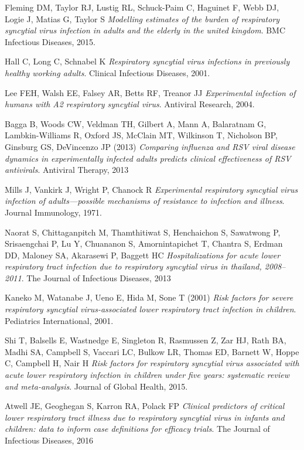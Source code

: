 \documentclass[a4paper]{article}
\begin{document}
\begin{thebibliography}{9}
Fleming DM, Taylor RJ, Lustig RL, Schuck-Paim C, Haguinet F, Webb DJ, Logie J, Matias G, Taylor S
\textit{Modelling estimates of the burden of respiratory syncytial virus infection in adults and the elderly in the united kingdom}.
BMC Infectious Diseases, 2015.

Hall C, Long C, Schnabel K
\textit{Respiratory syncytial virus infections in previously healthy working
adults}. 
Clinical Infectious Diseases, 2001.

Lee FEH, Walsh EE, Falsey AR, Betts RF, Treanor JJ
\textit{Experimental infection of humans with A2
respiratory syncytial virus}. 
Antiviral Research, 2004.

Bagga B, Woods CW, Veldman TH, Gilbert A, Mann A, Balaratnam G, Lambkin-Williams R, Oxford JS, McClain MT, Wilkinson T, Nicholson BP, Ginsburg GS, DeVincenzo JP (2013) 
\textit{Comparing influenza and RSV viral disease dynamics in experimentally infected adults predicts clinical effectiveness of RSV antivirals}. 
Antiviral Therapy, 2013

Mills J, Vankirk J, Wright P, Chanock R
\textit{Experimental respiratory syncytial virus infection of adults—possible mechanisms of resistance to infection and illness}. 
Journal Immunology, 1971.

Naorat S, Chittaganpitch M, Thamthitiwat S, Henchaichon S, Sawatwong P, Srisaengchai P, Lu Y, Chuananon S, Amornintapichet T, Chantra S, Erdman DD, Maloney SA, Akarasewi P, Baggett HC
\textit{Hospitalizations for acute lower respiratory tract infection due to respiratory syncytial virus in thailand, 2008–2011}.
The Journal of Infectious Diseases, 2013

Kaneko M, Watanabe J, Ueno E, Hida M, Sone T (2001) 
\textit{Risk factors for severe respiratory syncytial virus-associated lower respiratory tract infection in children}.
Pediatrics International, 2001.

Shi T, Balsells E, Wastnedge E, Singleton R, Rasmussen Z, Zar HJ, Rath BA, Madhi SA, Campbell S, Vaccari LC, Bulkow LR, Thomas ED, Barnett W, Hoppe C, Campbell H, Nair H
\textit{Risk factors for respiratory syncytial virus associated with acute lower respiratory infection in children under five years: systematic review and meta-analysis}. 
Journal of Global Health, 2015.

Atwell JE, Geoghegan S, Karron RA, Polack FP
\textit{Clinical predictors of critical lower respiratory
tract illness due to respiratory syncytial virus in infants and children: data to inform case definitions for efficacy trials}. 
The Journal of Infectious Diseases, 2016


\end{thebibliography}
\end{document}
